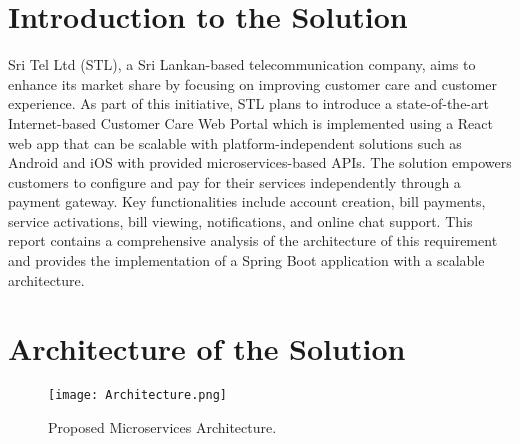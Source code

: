 \documentclass[12pt]{article}
\begin{document}


\setcounter{page}{2}
\pagestyle{fancy}
\fancyhf{}
\lhead{\color{gray}{\nouppercase{\leftmark}}}
\rfoot{\color{gray}{\thepage}}

\newpage

\tableofcontents

\listoffigures

\newpage
{} 


\section{Introduction to the Solution} 
Sri Tel Ltd (STL), a Sri Lankan-based telecommunication company, aims to enhance its market share by focusing on improving customer care and customer experience. As part of this initiative, STL plans to introduce a state-of-the-art Internet-based Customer Care Web Portal which is implemented using a React web app that can be scalable with platform-independent solutions such as Android and iOS with provided microservices-based APIs. The solution empowers customers to configure and pay for their services independently through a payment gateway. Key functionalities include account creation, bill payments, service activations, bill viewing, notifications, and online chat support. This report contains a comprehensive analysis of the architecture of this requirement and provides the implementation of a Spring Boot application with a scalable architecture.

\section{Architecture of the Solution}
\begin{figure}[ht]
    \centering
    \texttt{[image: Architecture.png]}
    \caption{Proposed Microservices Architecture.}
    \label{fig:your-figure-label}
\end{figure}
\end{document}
